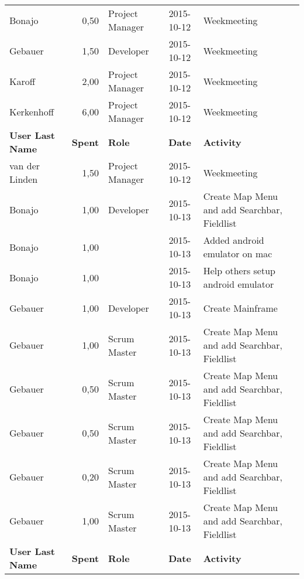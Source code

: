 \begin{longtable}{ l r p{2cm} c p{4cm}}
		Bonajo                  & 0,50           & Project Manager & 2015-10-12    & Weekmeeting                                     \\
		Gebauer                 & 1,50           & Developer       & 2015-10-12    & Weekmeeting                                     \\
		Karoff                  & 2,00           & Project Manager & 2015-10-12    & Weekmeeting                                     \\
		Kerkenhoff              & 6,00           & Project Manager & 2015-10-12    & Weekmeeting                                     \\
		\textbf{User Last Name} & \textbf{Spent} & \textbf{Role} & \textbf{Date} & \textbf{Activity} \\
		\hline
		van der Linden          & 1,50           & Project Manager & 2015-10-12    & Weekmeeting                                     \\
		Bonajo                  & 1,00           & Developer       & 2015-10-13    & Create Map Menu and add Searchbar, Fieldlist    \\
		Bonajo                  & 1,00           &                 & 2015-10-13    & Added android emulator on mac                   \\
		Bonajo                  & 1,00           &                 & 2015-10-13    & Help others setup android emulator              \\
		Gebauer                 & 1,00           & Developer       & 2015-10-13    & Create Mainframe                                \\
		Gebauer                 & 1,00           & Scrum Master    & 2015-10-13    & Create Map Menu and add Searchbar, Fieldlist    \\
		Gebauer                 & 0,50           & Scrum Master    & 2015-10-13    & Create Map Menu and add Searchbar, Fieldlist    \\
		Gebauer                 & 0,50           & Scrum Master    & 2015-10-13    & Create Map Menu and add Searchbar, Fieldlist    \\
		Gebauer                 & 0,20           & Scrum Master    & 2015-10-13    & Create Map Menu and add Searchbar, Fieldlist    \\
		Gebauer                 & 1,00           & Scrum Master    & 2015-10-13    & Create Map Menu and add Searchbar, Fieldlist    \\
		\textbf{User Last Name} & \textbf{Spent} & \textbf{Role} & \textbf{Date} & \textbf{Activity} \\

\end{longtable}
